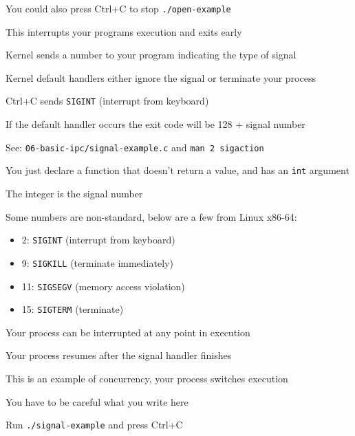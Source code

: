   \begin{slide}


    You could also press Ctrl+C to stop \texttt{./open-example}

    \leftspace{}This interrupts your programs execution and exits early
    \medskip

    Kernel sends a number to your program indicating the type of signal

    \leftspace{}Kernel default handlers either ignore the signal or terminate
    your process
    \medskip

    Ctrl+C sends \texttt{SIGINT} (interrupt from keyboard)
    \medskip

    If the default handler occurs the exit code will be 128 + signal number

  \end{slide}

  \begin{slide}


    See: \texttt{06-basic-ipc/signal-example.c} and \texttt{man 2 sigaction}
    \medskip

    You just declare a function that doesn't return a value, and has an \texttt{int} argument

    \leftspace{}The integer is the signal number
    \medskip

    Some numbers are non-standard, below are a few from Linux x86-64:
    \begin{itemize}
      \item 2: \texttt{SIGINT} (interrupt from keyboard)
      \item 9: \texttt{SIGKILL} (terminate immediately)
      \item 11: \texttt{SIGSEGV} (memory access violation)
      \item 15: \texttt{SIGTERM} (terminate)
    \end{itemize}

  \end{slide}

  \begin{slide}

    Your process can be interrupted at any point in execution

    \leftspace{}Your process resumes after the signal handler finishes
    \medskip

    This is an example of concurrency, your process switches execution

    \leftspace{}You have to be careful what you write here
    \medskip

    Run \texttt{./signal-example} and press Ctrl+C

  \end{slide}

